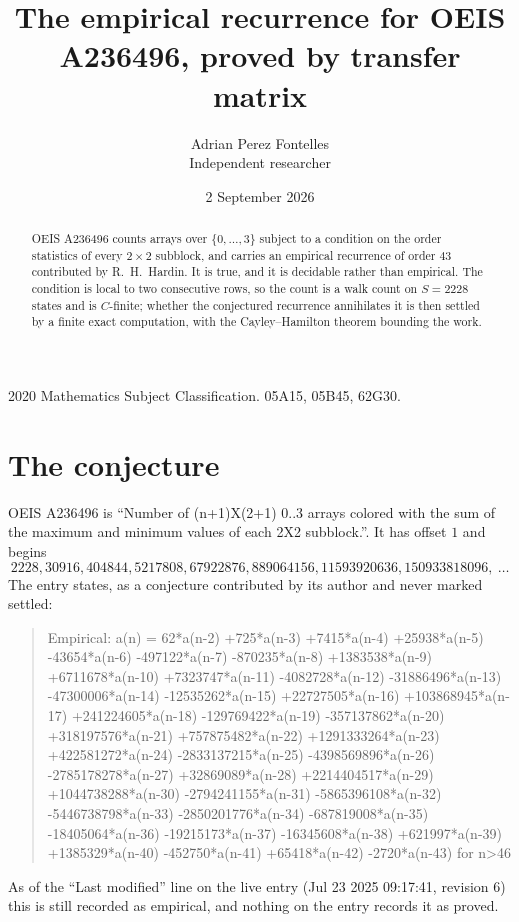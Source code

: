 \documentclass[11pt,a4paper]{article}
\title{The empirical recurrence for OEIS A236496, proved by transfer matrix}
\author{Adrian Perez Fontelles\\ \small Independent researcher}
\date{2 September 2026}
\theoremstyle{plain}
\theoremstyle{definition}
\begin{document}
\maketitle

\begin{abstract}
OEIS A236496 counts arrays over $\{0,\dots,3\}$ subject to a condition on the order
statistics of every $2\times2$ subblock, and carries an empirical recurrence of order
$43$ contributed by R.~H.~Hardin. It is true, and it is decidable rather than empirical.
The condition is local to two consecutive rows, so the count is a walk count on $S=2228$
states and is $C$-finite; whether the conjectured recurrence annihilates it is then settled by
a finite exact computation, with the Cayley--Hamilton theorem bounding the work.
\end{abstract}

\noindent\small 2020 Mathematics Subject Classification. 05A15, 05B45, 62G30.\normalsize

\section{The conjecture}

OEIS A236496 is ``Number of (n+1)X(2+1) 0..3 arrays colored with the sum of the maximum and minimum values of each 2X2 subblock.''. It has offset $1$ and begins
\[
2228, 30916, 404844, 5217808, 67922876, 889064156, 11593920636, 150933818096,\ \dots
\]
The entry states, as a conjecture contributed by its author and never marked settled:
\begin{quote}
Empirical: a(n) = 62*a(n-2) +725*a(n-3) +7415*a(n-4) +25938*a(n-5) -43654*a(n-6) -497122*a(n-7) -870235*a(n-8) +1383538*a(n-9) +6711678*a(n-10) +7323747*a(n-11) -4082728*a(n-12) -31886496*a(n-13) -47300006*a(n-14) -12535262*a(n-15) +22727505*a(n-16) +103868945*a(n-17) +241224605*a(n-18) -129769422*a(n-19) -357137862*a(n-20) +318197576*a(n-21) +757875482*a(n-22) +1291333264*a(n-23) +422581272*a(n-24) -2833137215*a(n-25) -4398569896*a(n-26) -2785178278*a(n-27) +32869089*a(n-28) +2214404517*a(n-29) +1044738288*a(n-30) -2794241155*a(n-31) -5865396108*a(n-32) -5446738798*a(n-33) -2850201776*a(n-34) -687819008*a(n-35) -18405064*a(n-36) -19215173*a(n-37) -16345608*a(n-38) +621997*a(n-39) +1385329*a(n-40) -452750*a(n-41) +65418*a(n-42) -2720*a(n-43) for n>46
\end{quote}
As of the ``Last modified'' line on the live entry (Jul 23 2025 09:17:41, revision 6) this is still
recorded as empirical, and nothing on the entry records it as proved.
\end{document}
